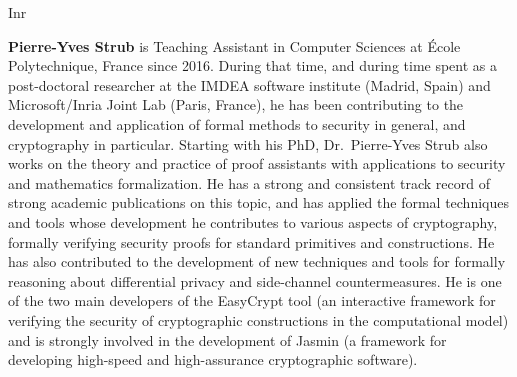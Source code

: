 \begin{sitedescription}{Inr}
\begin{compactitem}
\item {\bf Pierre-Yves Strub}
is Teaching Assistant in Computer Sciences at École
Polytechnique, France since 2016. During that time, and during time
spent as a post-doctoral researcher at the IMDEA software institute
(Madrid, Spain) and Microsoft/Inria Joint Lab (Paris, France), he has
been contributing to the development and application of formal methods
to security in general, and cryptography in particular. Starting with
his PhD, Dr.~Pierre-Yves Strub also works on the theory and practice
of proof assistants with applications to security and mathematics
formalization.
%
He has a strong and consistent track record of strong academic
publications on this topic, and has applied the formal techniques and
tools whose development he contributes to various aspects of
cryptography, formally verifying security proofs for standard
primitives and constructions.  He has also contributed to the
development of new techniques and tools for formally reasoning about
differential privacy and side-channel countermeasures.
%
He is one of the two main developers of the EasyCrypt tool (an
interactive framework for verifying the security of cryptographic
constructions in the computational model) and is strongly involved in
the development of Jasmin (a framework for developing high-speed and
high-assurance cryptographic software).

\end{compactitem}

\end{sitedescription}

